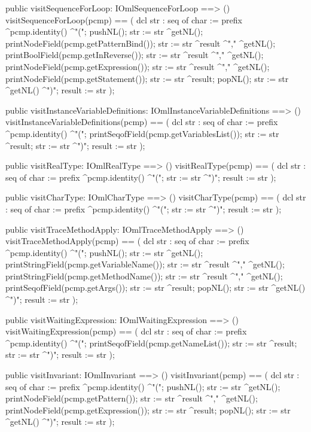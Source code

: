 \begin{vdm_al}
  public visitSequenceForLoop: IOmlSequenceForLoop ==> ()
  visitSequenceForLoop(pcmp) ==
    ( dcl str : seq of char := prefix ^pcmp.identity() ^"(";
      pushNL();
      str := str ^getNL();
      printNodeField(pcmp.getPatternBind());
      str := str ^result ^"," ^getNL();
      printBoolField(pcmp.getInReverse());
      str := str ^result ^"," ^getNL();
      printNodeField(pcmp.getExpression());
      str := str ^result ^"," ^getNL();
      printNodeField(pcmp.getStatement());
      str := str ^result;
      popNL();
      str := str ^getNL() ^")";
      result := str );

  public visitInstanceVariableDefinitions: IOmlInstanceVariableDefinitions ==> ()
  visitInstanceVariableDefinitions(pcmp) ==
    ( dcl str : seq of char := prefix ^pcmp.identity() ^"(";
      printSeqofField(pcmp.getVariablesList());
      str := str ^result;
      str := str ^")";
      result := str );

  public visitRealType: IOmlRealType ==> ()
  visitRealType(pcmp) ==
    ( dcl str : seq of char := prefix ^pcmp.identity() ^"(";
      str := str ^")";
      result := str );

  public visitCharType: IOmlCharType ==> ()
  visitCharType(pcmp) ==
    ( dcl str : seq of char := prefix ^pcmp.identity() ^"(";
      str := str ^")";
      result := str );

  public visitTraceMethodApply: IOmlTraceMethodApply ==> ()
  visitTraceMethodApply(pcmp) ==
    ( dcl str : seq of char := prefix ^pcmp.identity() ^"(";
      pushNL();
      str := str ^getNL();
      printStringField(pcmp.getVariableName());
      str := str ^result ^"," ^getNL();
      printStringField(pcmp.getMethodName());
      str := str ^result ^"," ^getNL();
      printSeqofField(pcmp.getArgs());
      str := str ^result;
      popNL();
      str := str ^getNL() ^")";
      result := str );

  public visitWaitingExpression: IOmlWaitingExpression ==> ()
  visitWaitingExpression(pcmp) ==
    ( dcl str : seq of char := prefix ^pcmp.identity() ^"(";
      printSeqofField(pcmp.getNameList());
      str := str ^result;
      str := str ^")";
      result := str );

  public visitInvariant: IOmlInvariant ==> ()
  visitInvariant(pcmp) ==
    ( dcl str : seq of char := prefix ^pcmp.identity() ^"(";
      pushNL();
      str := str ^getNL();
      printNodeField(pcmp.getPattern());
      str := str ^result ^"," ^getNL();
      printNodeField(pcmp.getExpression());
      str := str ^result;
      popNL();
      str := str ^getNL() ^")";
      result := str );


\end{vdm_al}
